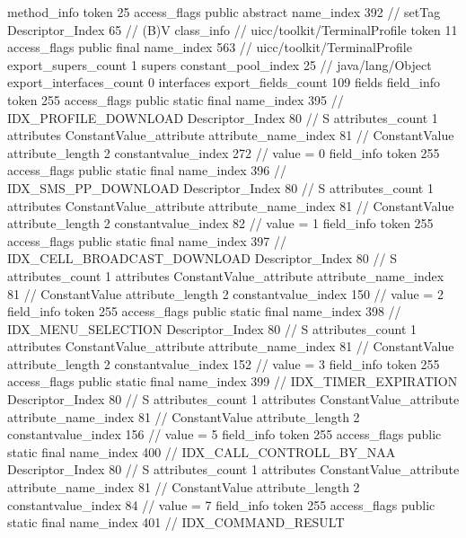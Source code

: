{{{{{				}
				method_info {
					token	25
					access_flags	public abstract
					name_index	392		// setTag
					Descriptor_Index	65		// (B)V
				}
			}
		}
		class_info {		// uicc/toolkit/TerminalProfile
			token	11
			access_flags	public final
			name_index	563		// uicc/toolkit/TerminalProfile
			export_supers_count	1
			supers {
				constant_pool_index	25		// java/lang/Object
			}
			export_interfaces_count	0
			interfaces {
			}
			export_fields_count	109
			fields {
			field_info {
				token	255
				access_flags	public static final
				name_index	395		// IDX_PROFILE_DOWNLOAD
				Descriptor_Index	80		// S
				attributes_count	1
				attributes {
				ConstantValue_attribute {
					attribute_name_index	81		// ConstantValue
					attribute_length	2
					constantvalue_index	272		// value = 0
				}
				}
			}
			field_info {
				token	255
				access_flags	public static final
				name_index	396		// IDX_SMS_PP_DOWNLOAD
				Descriptor_Index	80		// S
				attributes_count	1
				attributes {
				ConstantValue_attribute {
					attribute_name_index	81		// ConstantValue
					attribute_length	2
					constantvalue_index	82		// value = 1
				}
				}
			}
			field_info {
				token	255
				access_flags	public static final
				name_index	397		// IDX_CELL_BROADCAST_DOWNLOAD
				Descriptor_Index	80		// S
				attributes_count	1
				attributes {
				ConstantValue_attribute {
					attribute_name_index	81		// ConstantValue
					attribute_length	2
					constantvalue_index	150		// value = 2
				}
				}
			}
			field_info {
				token	255
				access_flags	public static final
				name_index	398		// IDX_MENU_SELECTION
				Descriptor_Index	80		// S
				attributes_count	1
				attributes {
				ConstantValue_attribute {
					attribute_name_index	81		// ConstantValue
					attribute_length	2
					constantvalue_index	152		// value = 3
				}
				}
			}
			field_info {
				token	255
				access_flags	public static final
				name_index	399		// IDX_TIMER_EXPIRATION
				Descriptor_Index	80		// S
				attributes_count	1
				attributes {
				ConstantValue_attribute {
					attribute_name_index	81		// ConstantValue
					attribute_length	2
					constantvalue_index	156		// value = 5
				}
				}
			}
			field_info {
				token	255
				access_flags	public static final
				name_index	400		// IDX_CALL_CONTROLL_BY_NAA
				Descriptor_Index	80		// S
				attributes_count	1
				attributes {
				ConstantValue_attribute {
					attribute_name_index	81		// ConstantValue
					attribute_length	2
					constantvalue_index	84		// value = 7
				}
				}
			}
			field_info {
				token	255
				access_flags	public static final
				name_index	401		// IDX_COMMAND_RESULT
}}}}}
